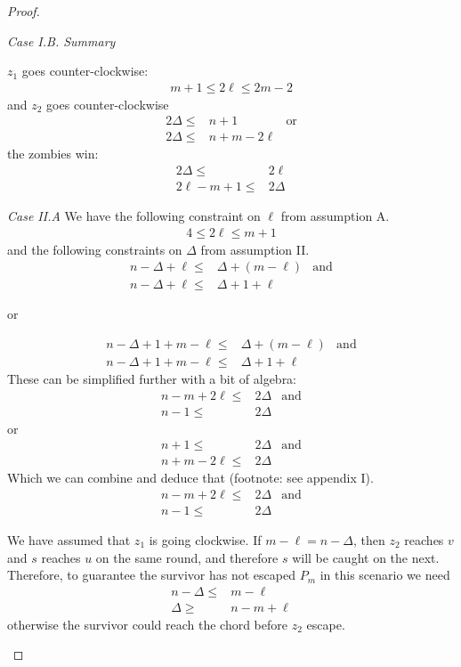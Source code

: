 \begin{proof}
\begin{proofpart}
  \textit{Case I.B. Summary}

  $z_1$ goes counter-clockwise:
  \begin{align*}
   m + 1 \leq 2 \ell \leq 2m - 2
  \end{align*}
  and $z_2$ goes counter-clockwise
  \begin{align*}
   2 \Delta \leq & n + 1         & \text{or} \\
   2 \Delta \leq & n + m - 2\ell
  \end{align*}
  the zombies win:
  \begin{align*}
   2 \Delta \leq      & 2 \ell   \\
   2\ell - m + 1 \leq & 2 \Delta
  \end{align*}

  \textit{Case II.A} We have the following constraint on $\ell$ from
  assumption A.
  \begin{align*}
   4 \leq 2 \ell \leq m + 1
  \end{align*}
  and the following constraints on $\Delta$ from assumption II.
  \begin{align*}
   n - \Delta + \ell \leq & \Delta + (m - \ell) & \text{and} \\
   n - \Delta + \ell \leq & \Delta + 1 + \ell
  \end{align*}
  \begin{center}or\end{center}
  \begin{align*}
   n - \Delta + 1 + m - \ell \leq & \Delta + (m - \ell) & \text{and} \\
   n - \Delta + 1 + m - \ell \leq & \Delta + 1 + \ell
  \end{align*}
  These can be simplified further with a bit of algebra:
  \begin{align*}
   n-m +2\ell \leq & 2 \Delta & \text{and} \\
   n-1 \leq        & 2\Delta
  \end{align*}
  or
  \begin{align*}
   n + 1 \leq         & 2 \Delta & \text{and} \\
   n + m - 2\ell \leq & 2 \Delta
  \end{align*}
  Which we can combine and deduce that (footnote: see appendix I).
  \begin{align*}
   n -m + 2\ell \leq & 2 \Delta & \text{and} \\
   n-1 \leq          & 2 \Delta
  \end{align*}

  We have assumed that $z_1$ is going clockwise. If $m - \ell = n - \Delta$,
  then $z_2$ reaches $v$ and $s$ reaches $u$ on the same round, and therefore $s$
  will be caught on the next. Therefore, to guarantee the survivor has not
  escaped $P_m$ in this scenario we need
  \begin{align*}
   n - \Delta \leq & m - \ell     \\
   \Delta \geq     & n - m + \ell
  \end{align*}
  otherwise the survivor could reach the chord before $z_2$ escape.


\end{proofpart}
\end{proof}

